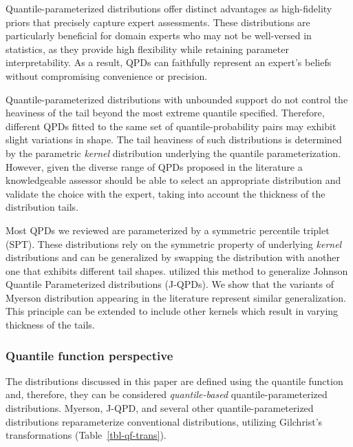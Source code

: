 \documentclass[
  fleqn,
  deca,
  blindrev
]{informs4}
\begin{document}
Quantile-parameterized distributions offer distinct advantages as
high-fidelity priors that precisely capture expert assessments. These
distributions are particularly beneficial for domain experts who may not
be well-versed in statistics, as they provide high flexibility while
retaining parameter interpretability. As a result, QPDs can faithfully
represent an expert's beliefs without compromising convenience or
precision.

\textcolor[HTML]{ff0000}{Quantile-parameterized distributions with
unbounded support do not control the heaviness of the tail beyond the
most extreme quantile specified. Therefore,} different QPDs fitted to
the same set of quantile-probability pairs may exhibit slight variations
in shape. \textcolor[HTML]{ff0000}{The tail heaviness of such
distributions is determined by the parametric \emph{kernel} distribution
underlying the quantile parameterization.} However, given the diverse
range of QPDs proposed in the literature a knowledgeable assessor should
be able to select an appropriate distribution and validate the choice
with the expert, taking into account the thickness of the distribution
tails.

Most QPDs we reviewed are parameterized by a symmetric percentile
triplet (SPT). These distributions rely on the symmetric property of
underlying \emph{kernel} distributions and can be generalized by
swapping the distribution with another one that exhibits different tail
shapes. \citet{hadlock2019GeneralizedJohnsonQuantileParameterized}
utilized this method to generalize Johnson Quantile Parameterized
distributions (J-QPDs). We show that the variants of Myerson
distribution appearing in the literature
\citep{myerson2005ProbabilityModelsEconomic, wilson2023ReconciliationExpertPriors}
represent similar generalization. This principle can be extended to
include other kernels which result in varying thickness of the tails.

\subsubsection*{Quantile function
perspective}\label{quantile-function-perspective}

The distributions discussed in this paper are defined using the quantile
function and, therefore, they can be considered \emph{quantile-based}
quantile-parameterized distributions. Myerson, J-QPD, and several other
quantile-parameterized distributions reparameterize conventional
distributions, utilizing Gilchrist's transformations
(Table~\ref{tbl-qf-trans}).
\end{document}
